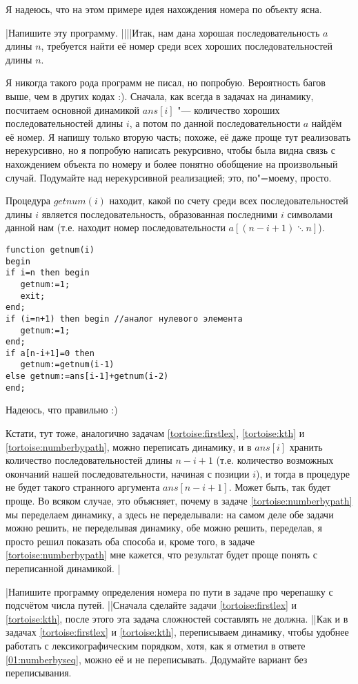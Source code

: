 Я надеюсь, что на этом примере идея нахождения номера по объекту ясна. 

\task|Напишите эту программу.
||||Итак, нам дана хорошая последовательность $a$ длины $n$, требуется найти её номер среди всех хороших 
последовательностей длины $n$.

Я никогда такого рода программ не писал, но попробую. Вероятность багов выше, чем в других 
кодах :). Сначала, как всегда в задачах на динамику, посчитаем основной динамикой $ans[i]$ "--- 
количество хороших последовательностей длины $i$, а потом по данной последовательности $a$ найдём 
её номер. Я напишу только вторую часть; похоже, её даже проще тут реализовать нерекурсивно, но я 
попробую написать рекурсивно, чтобы была видна связь с нахождением объекта по номеру и более 
понятно обобщение на произвольный случай. Подумайте над нерекурсивной реализацией; это, по"=моему, просто.

Процедура $getnum(i)$ находит, какой по счету среди всех последовательностей длины $i$ является 
последовательность, образованная последними $i$ символами данной нам (т.е. находит номер 
последовательности $a[(n-i+1)\ddots n]$).
\begin{codesampleo}\begin{verbatim}
function getnum(i)
begin
if i=n then begin
   getnum:=1;
   exit;
end;
if (i=n+1) then begin //аналог нулевого элемента
   getnum:=1;
end;
if a[n-i+1]=0 then
   getnum:=getnum(i-1)
else getnum:=ans[i-1]+getnum(i-2)
end;
\end{verbatim}
\end{codesampleo}
Надеюсь, что правильно :)

Кстати, тут тоже, аналогично задачам \ref{tortoise:firstlex}, \ref{tortoise:kth} и 
\ref{tortoise:numberbypath}, можно переписать динамику, и в $ans[i]$ хранить количество 
последовательностей длины $n-i+1$ (т.е. количество возможных окончаний нашей последовательности, 
начиная с позиции $i$), и тогда в процедуре не будет такого странного аргумента $ans[n-i+1]$. Может 
быть, так будет проще. Во всяком случае, это объясняет, почему в задаче 
\ref{tortoise:numberbypath} мы переделаем динамику, а здесь не переделывали: на самом деле 
обе задачи можно решить, не переделывая динамику, обе можно решить, переделав, я просто решил 
показать оба способа и, кроме того, в задаче \ref{tortoise:numberbypath} мне кажется, что результат 
будет проще понять с переписанной динамикой.
|\label{01:numberbyseq}

\task|Напишите программу определения номера по пути в задаче про черепашку с подсчётом числа путей.
||Сначала сделайте задачи \ref{tortoise:firstlex} и \ref{tortoise:kth}, после этого эта задача 
сложностей составлять не должна.
||Как и в задачах \ref{tortoise:firstlex} и \ref{tortoise:kth}, переписываем динамику, чтобы 
удобнее работать с лексикографическим порядком, хотя, как я отметил в ответе \ref{01:numberbyseq}, 
можно её и не переписывать. Додумайте вариант без переписывания.

